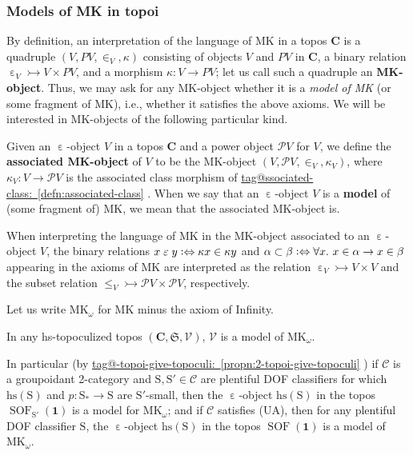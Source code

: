 \documentclass{amsart}
\makeatletter
\newcommand\bC{\mathbf{C}}
\newcommand\cC{\mathcal{C}}
\newcommand\cV{\mathcal{V}}
\newcommand\defiff{\mathrel{\vcenter{\baselineskip0.7ex \lineskiplimit0pt \hbox{.}\hbox{.}}} \Leftrightarrow}
\newcommand\defword[1]{{\boldmath \textbf{#1}}}
\newcommand\ein{\mathrel{\varepsilon}}
\newcommand\fS{\mathfrak{S}}
\newcommand\hs{\mathrm{hs}}
\newcommand\MKo{\mathrm{MK}_{\omega}}
\newcommand\pow{\mathcal{P}}
\newcommand\rS{\mathrm{S}}
\newcommand\SOF{\operatorname{SOF}}
\newcommand\tm{\mathbf{1}}
\newcommand\tto{\rightarrowtail}
\newcommand\unein{{\ein}}
\newcommand\tagword[1]{\csname tag@#1\endcsname}
\def\label@tag#1:#2\@nil{#1}
\newcommand\labeltag[1]{\label@tag#1:\@nil}
\newcommand\jref[1]{%
  \texorpdfstring%
    {\hyperref[#1]{\tagword{\labeltag{#1}}~\ref*{#1}}}%
    {\tagword{\labeltag{#1}}~\ref*{#1}}%
}
\theoremstyle{definition}
\theoremstyle{remark}
\theoremstyle{plainwithref}
\makeatother
\begin{document}
\subsubsection{Models of MK in topoi}
By definition, an interpretation of the language of MK in a topos \( \bC \) is a quadruple \( (V, P V, \in_V, \kappa) \) consisting of objects \( V \) and \( P V \) in \( \bC \), a binary relation \( \unein_V \tto V \times P V \), and a morphism \( \kappa \colon V \to P V \); let us call such a quadruple an \defword{MK-object}.
Thus, we may ask for any MK-object whether it is a \emph{model of MK} (or some fragment of MK), i.e., whether it satisfies the above axioms.
We will be interested in MK-objects of the following particular kind.
\begin{defn} \label{defn:associated-mk}
  Given an \( \unein \)-object \( V \) in a topos \( \bC \) and a power object \( \pow V \) for \( V \), we define the \defword{associated MK-object} of \( V \) to be the MK-object \( (V, \pow V, \in_{V}, \kappa_V) \), where \( \kappa_V \colon V \to \pow V \) is the associated class morphism of \jref{defn:associated-class}.
  When we say that an \( \unein \)-object \( V \) is a \textbf{model} of (some fragment of) MK, we mean that the associated MK-object is.
\end{defn}
\begin{rmk}
  When interpreting the language of MK in the MK-object associated to an \( \unein \)-object \( V \), the binary relations \( x \ein y \defiff \kappa x \in \kappa y \) and \( \alpha \subset \beta \defiff \forall x.\ x \in \alpha \to x \in \beta \) appearing in the axioms of MK are interpreted as the relation \( \unein_V \tto V \times V \) and the subset relation \( {\le}_V \tto \pow V \times \pow V \), respectively.
\end{rmk}

Let us write \( \MKo \) for MK minus the axiom of Infinity.
\begin{thm} \label{thm:model-of-mk}
  In any hs-topoculized topos \( (\bC, \fS, \cV) \), \( \cV \) is a model of \( \MKo \).

  In particular (by \jref{propn:2-topoi-give-topoculi}) if \( \cC \) is a groupoidant 2-category and \( \rS,\rS' \in \cC \) are plentiful DOF classifiers for which \( \hs(\rS) \) and \( p \colon \rS_* \to \rS \) are \( \rS' \)-small, then the \( \unein \)-object \( \hs(\rS) \) in the topos \( \SOF_{\rS'}(\tm) \) is a model for \( \MKo \); and if \( \cC \) satisfies (UA), then for any plentiful DOF classifier \( \rS \), the \( \unein \)-object \( \hs(\rS) \) in the topos \( \SOF(\tm) \) is a model of \( \MKo \).
\end{thm}
\end{document}
